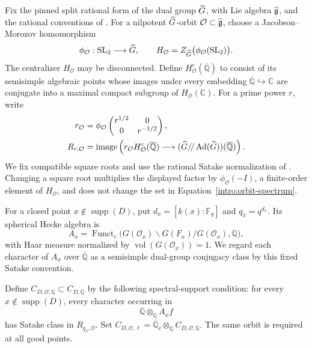 Fix the pinned split rational form of the dual group \(\widehat G\), with Lie
algebra \(\widehat{\mathfrak g}\), and the rational conventions of
\cite[Sections~3.1.1 and 3.4.1--3.4.3]{GLR}.
For a nilpotent \(\widehat G\)-orbit \(\mathcal O\subset\widehat{\mathfrak g}\), choose a
Jacobson--Morozov homomorphism
\[
 \phi_{\mathcal O}:\mathrm{SL}_2\longrightarrow\widehat G,
 \qquad
 H_{\mathcal O}=Z_{\widehat G}\bigl(\phi_{\mathcal O}(\mathrm{SL}_2)\bigr).
\]
The centralizer \(H_{\mathcal O}\) may be disconnected. Define
\(H_{\mathcal O}^{c}(\overline{\mathbb Q})\) to consist of its
semisimple algebraic points whose images under every embedding
\(\overline{\mathbb Q}\hookrightarrow\mathbb C\) are conjugate
into a maximal compact subgroup of \(H_{\mathcal O}(\mathbb C)\).
For a prime power \(r\), write
\begin{equation}\label{intro:orbit-spectrum}
 \begin{split}
 r_{\mathcal O}
  &=\phi_{\mathcal O}
       \begin{pmatrix}r^{1/2}&0\\0&r^{-1/2}\end{pmatrix},\\
 R_{r,\mathcal O}
  &=\operatorname{image}\left(
       r_{\mathcal O}H_{\mathcal O}^{c}(\overline{\mathbb Q})
       \longrightarrow
       (\widehat G/\!/\operatorname{Ad}(\widehat G))(\overline{\mathbb Q})
     \right).
 \end{split}
\end{equation}
We fix compatible square roots and use the rational Satake normalization
of \cite[Equation~(3.2)]{GLR}. Changing a square root multiplies the displayed
factor by \(\phi_{\mathcal O}(-I)\), a finite-order element of
\(H_{\mathcal O}\), and does not change the set
in Equation~\eqref{intro:orbit-spectrum}.

For a closed point \(x\notin\operatorname{supp}(D)\), put
\(d_x=[k(x):\mathbb F_q]\) and \(q_x=q^{d_x}\). Its spherical
Hecke algebra is
\[
 A_x=\operatorname{Funct}_c
       \bigl(G(\mathcal O_x)\backslash G(F_x)/G(\mathcal O_x),\mathbb Q\bigr),
\]
with Haar measure normalized by
\(\operatorname{vol}(G(\mathcal O_x))=1\). We regard each character
of \(A_x\) over \(\overline{\mathbb Q}\) as a semisimple dual-group
conjugacy class by this fixed Satake convention.

Define \(C_{D,\mathcal O,\mathbb Q}\subset C_{D,\mathbb Q}\) by the
following spectral-support condition: for every
\(x\notin\operatorname{supp}(D)\), every character occurring in
\[
 \overline{\mathbb Q}\otimes_{\mathbb Q} A_xf
\]
has Satake class in \(R_{q_x,\mathcal O}\). Set
\(C_{D,\mathcal O,\ell}
 =\overline{\mathbb Q}_\ell\otimes_{\mathbb Q}
 C_{D,\mathcal O,\mathbb Q}\).
The same orbit is required at all good points.

